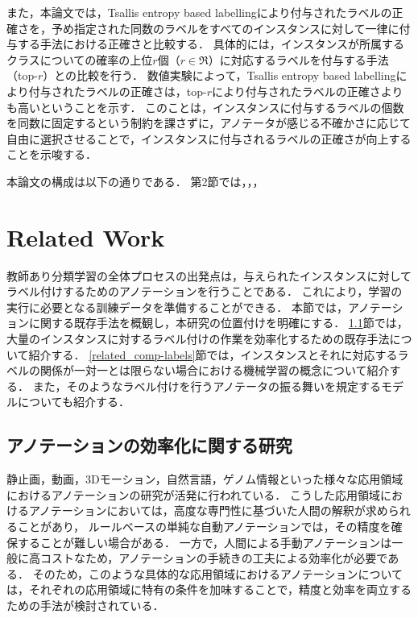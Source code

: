 \documentclass[a4paper,conference]{IEEEtran}
\begin{document}
また，本論文では，Tsallis entropy based labellingにより付与されたラベルの正確さを，予め指定された同数のラベルをすべてのインスタンスに対して一律に付与する手法における正確さと比較する．
具体的には，インスタンスが所属するクラスについての確率の上位$r$個（$r \in \mathfrak{R}$）に対応するラベルを付与する手法（top-$r$）との比較を行う．
数値実験によって，Tsallis entropy based labellingにより付与されたラベルの正確さは，top-$r$により付与されたラベルの正確さよりも高いということを示す．
このことは，インスタンスに付与するラベルの個数を同数に固定するという制約を課さずに，アノテータが感じる不確かさに応じて自由に選択させることで，インスタンスに付与されるラベルの正確さが向上することを示唆する．

本論文の構成は以下の通りである．
第2節では，，，

\section{Related Work}
教師あり分類学習の全体プロセスの出発点は，与えられたインスタンスに対してラベル付けするためのアノテーションを行うことである．
これにより，学習の実行に必要となる訓練データを準備することができる．
本節では，アノテーションに関する既存手法を概観し，本研究の位置付けを明確にする．
\ref{subsec:cost_reduction}節では，大量のインスタンスに対するラベル付けの作業を効率化するための既存手法について紹介する．
\ref{related_comp-labels}節では，インスタンスとそれに対応するラベルの関係が一対一とは限らない場合における機械学習の概念について紹介する．
また，そのようなラベル付けを行うアノテータの振る舞いを規定するモデルについても紹介する．


\subsection{アノテーションの効率化に関する研究}\label{subsec:cost_reduction}
静止画，動画，3Dモーション，自然言語，ゲノム情報といった様々な応用領域におけるアノテーションの研究が活発に行われている\cite{Zhang:2012,Russakovsky:2015,Muller:2009,Bird:2013,Richardson:2012}．
こうした応用領域におけるアノテーションにおいては，高度な専門性に基づいた人間の解釈が求められることがあり， ルールベースの単純な自動アノテーションでは，その精度を確保することが難しい場合がある．
一方で，人間による手動アノテーションは一般に高コストなため，アノテーションの手続きの工夫による効率化が必要である．
そのため，このような具体的な応用領域におけるアノテーションについては，それぞれの応用領域に特有の条件を加味することで，精度と効率を両立するための手法が検討されている．
\end{document}
